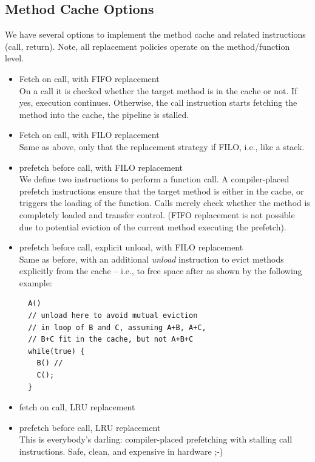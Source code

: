 \documentclass[a4paper,fontsize=10pt,twoside,DIV15,BCOR12mm,headinclude=true,footinclude=false,pagesize,bibtotoc]{scrbook}
\begin{document}
\subsection{Method Cache Options}
\label{sec:method_cache_options}

We have several options to implement the method cache and related instructions
(call, return). Note, all replacement policies operate on the method/function
level.
\begin{itemize}
  \item Fetch on call, with FIFO replacement \\
        On a call it is checked whether the target method is in the cache or
        not. If yes, execution continues. Otherwise, the call instruction
        starts fetching the method into the cache, the pipeline is stalled.
  \item Fetch on call, with FILO replacement \\
        Same as above, only that the replacement strategy if FILO, i.e., like a
        stack.
  \item prefetch before call, with FILO replacement \\
        We define two instructions to perform a function call. A compiler-placed
        prefetch instructions ensure that the target method is either in the
        cache, or triggers the loading of the function. Calls merely check
        whether the method is completely loaded and transfer control.
        (FIFO replacement is not possible due to potential eviction of the
        current method executing the prefetch).
  \item prefetch before call, explicit unload, with FILO replacement \\
        Same as before, with an additional \emph{unload} instruction to evict
        methods explicitly from the cache -- i.e., to free space after as shown
        by the following example:
\begin{verbatim}
  A()
  // unload here to avoid mutual eviction
  // in loop of B and C, assuming A+B, A+C,
  // B+C fit in the cache, but not A+B+C
  while(true) {
    B() //
    C();
  }
\end{verbatim}
  \item fetch on call, LRU replacement
  \item prefetch before call, LRU replacement \\
        This is everybody's darling: compiler-placed prefetching with stalling
        call instructions. Safe, clean, and expensive in hardware ;-)
\end{itemize}
\end{document}

